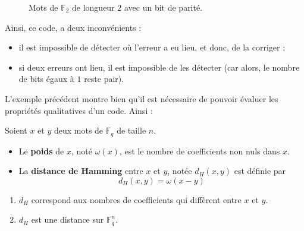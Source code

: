 \begin{example}
\begin{minipage}{0.45\textwidth}
\begin{figure}[H]
\begin{center}
\begin{tikzpicture}[scale=2]
          \end{tikzpicture}
        \end{center}
        \caption{Mots de $\mathbb{F}_2$ de longueur $2$ avec un bit de parité.}
      \end{figure}
    \end{minipage}
    \newpar
    Ainsi, ce code, a deux inconvénients :
    \begin{itemize}
      \item il est impossible de détecter où l'erreur a eu lieu, et donc, de la corriger ;
      \item si deux erreurs ont lieu, il est impossible de les détecter (car alors, le nombre de bits égaux à $1$ reste pair).
    \end{itemize}
  \end{example}

  L'exemple précédent montre bien qu'il est nécessaire de pouvoir évaluer les propriétés qualitatives d'un code. Ainsi :

  \begin{definition}
    Soient $x$ et $y$ deux mots de $\mathbb{F}_q$ de taille $n$.
    \begin{itemize}
      \item Le \textbf{poids} de $x$, noté $\omega(x)$, est le nombre de coefficients non nuls dans $x$.
      \item La \textbf{distance de Hamming} entre $x$ et $y$, notée $d_H(x,y)$ est définie par
      \[ d_H(x,y) = \omega(x-y) \]
    \end{itemize}
  \end{definition}

  \begin{proposition}
    \begin{enumerate}[label={\bfseries(\roman*)}]
      \item $d_H$ correspond aux nombres de coefficients qui diffèrent entre $x$ et $y$.
      \item $d_H$ est une distance sur $\mathbb{F}_q^n$.
    \end{enumerate}
  \end{proposition}

